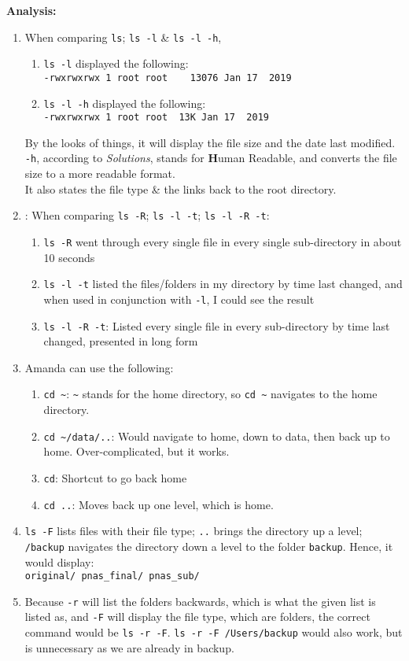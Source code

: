 \documentclass{article}
\begin{document}
\textbf{Analysis:}
\begin{enumerate}
    \item When comparing \verb|ls|; \verb|ls -l| \& \verb|ls -l -h|, 
    \begin{enumerate}
        \item \verb|ls -l| displayed the following: \\
        \verb|-rwxrwxrwx 1 root root    13076 Jan 17  2019|
        \item \verb|ls -l -h| displayed the following: \\
        \verb|-rwxrwxrwx 1 root root  13K Jan 17  2019|
    \end{enumerate}
        By the looks of things, it will display the file size and the date last modified. \verb|-h|, according to \textit{Solutions}, stands for \textbf{H}uman Readable, and converts the file size to a more readable format.\\
        It also states the file type \& the links back to the root directory.
    \item: When comparing \verb|ls -R|; \verb|ls -l -t|; \verb|ls -l -R -t|:
    \begin{enumerate}
        \item \verb|ls -R| went through every single file in every single sub-directory in about 10 seconds
        \item \verb|ls -l -t| listed the files/folders in my directory by time last changed, and when used in conjunction with \verb|-l|, I could see the result
        \item \verb|ls -l -R -t|: Listed every single file in every sub-directory by time last changed, presented in long form
    \end{enumerate}
    \item Amanda can use the following:
    \begin{enumerate}
        \item \verb|cd ~|: \verb|~| stands for the home directory, so \verb|cd ~| navigates to the home directory.
        \item \verb|cd ~/data/..|: Would navigate to home, down to data, then back up to home. Over-complicated, but it works.
        \item \verb|cd|: Shortcut to go back home
        \item \verb|cd ..|: Moves back up one level, which is home.
    \end{enumerate}
    \item \verb|ls -F| lists files with their file type; \verb|..| brings the directory up a level; \verb|/backup| navigates the directory down a level to the folder \verb|backup|. Hence, it would display:\\
    \verb|original/ pnas_final/ pnas_sub/|
    \item Because \verb|-r| will list the folders backwards, which is what the given list is listed as, and \verb|-F| will display the file type, which are folders, the correct command would be \verb|ls -r -F|. \verb|ls -r -F /Users/backup| would also work, but is unnecessary as we are already in backup.
\end{enumerate}
\end{document}

